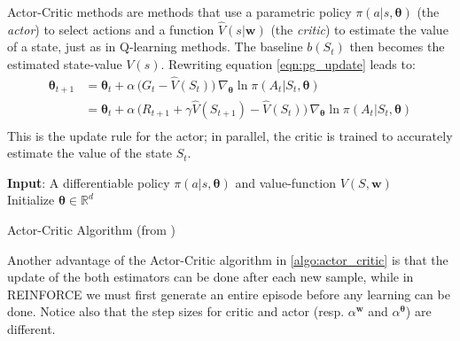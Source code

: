 Actor-Critic methods \cite{konda2000actor} are methods that use a parametric policy $\pi(a|s, \bm{\theta})$ (the \emph{actor}) to select actions and a function $\hat V(s|\bm{w})$ (the \emph{critic}) to estimate the value of a state, just as in Q-learning methods. The baseline $b(S_t)$ then becomes the estimated state-value $V(s)$. Rewriting equation \ref{eqn:pg_update} leads to:
\begin{equation}
    \label{eqn:actor_critic}
    \begin{split}
    \bm{\theta}_{t+1} &= \bm{\theta}_{t} + \alpha \,\big ( G_t - \hat V(S_t) \big) \,                                       \nabla_{\bm{\theta}} \ln \pi(A_t|S_t,\bm{\theta}) \\
                     &= \bm{\theta}_{t} + \alpha \,\big ( R_{t+1}+\gamma \hat V(S_{t+1}) - \hat V(S_t) \big) \,                                       \nabla_{\bm{\theta}} \ln \pi(A_t|S_t,\bm{\theta}) \\
    \end{split}
\end{equation}
This is the update rule for the actor; in parallel, the critic is trained to accurately estimate the value of the state $S_t$.

\begin{algorithm}[H]
\SetAlgoLined
\textbf{Input}: A differentiable policy $\pi(a|s, \bm{\theta})$ and value-function $V(S, \bm{w})$\\
Initialize $\bm{\theta} \in \mathbb{R}^d$\\
 \caption{Actor-Critic Algorithm (from \cite{sutton2018reinforcement})}
 \label{algo:actor_critic}
\end{algorithm}
Another advantage of the Actor-Critic algorithm in \ref{algo:actor_critic} is that the update of the both estimators can be done after each new sample, while in REINFORCE we must first generate an entire episode before any learning can be done. Notice also that the step sizes for critic and actor (resp. $\alpha^{\bm{w}}$ and $\alpha^{\bm{\theta}}$) are different.\\

